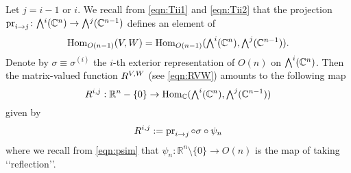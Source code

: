 Let $j=i-1$ or $i$.  
We recall from \eqref{eqn:Tii1} and \eqref{eqn:Tii2}
 that the projection $\pr i j \colon \Exterior^i({\mathbb{C}}^n) \to \Exterior^j({\mathbb{C}}^{n-1})$
 defines an element of 
\[
   {\operatorname{Hom}}_{O(n-1)}(V,W)
   =
   {\operatorname{Hom}}_{O(n-1)}({\Exterior}^i({\mathbb{C}}^n),{\Exterior}^j({\mathbb{C}}^{n-1})).  
\]
Denote by $\sigma \equiv \sigma^{(i)}$ 
 the $i$-th exterior representation of $O(n)$ on ${\Exterior}^i({\mathbb{C}}^n)$.  
Then the matrix-valued function $R^{{V},{W}}$ 
(see \eqref{eqn:RVW})
 amounts to the following map  
\[
\Rij i j : {\mathbb{R}}^n \setminus \{ 0 \} 
            \to 
           \operatorname{Hom}_{\mathbb{C}}({\Exterior}^i({\mathbb{C}}^n),
                            {\Exterior}^j({\mathbb{C}}^{n-1}) )
\]
given by 
\begin{equation}
\label{eqn:Rij}
   R^{{i},{j}} := \operatorname{pr}_{{i}\to{j}}  \circ \sigma \circ \psi_n
\end{equation}
where we recall from \eqref{eqn:psim}
 that $\psi_n \colon {\mathbb{R}}^n \setminus\{0\} \to O(n)$
 is the map of taking \lq\lq{reflection}\rq\rq.  


